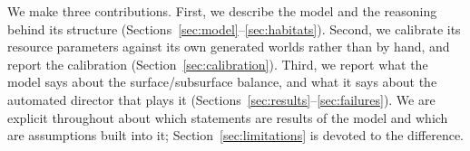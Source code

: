 We make three contributions. First, we describe the model and the reasoning
behind its structure (Sections~\ref{sec:model}--\ref{sec:habitats}). Second, we
calibrate its resource parameters against its own generated worlds rather than
by hand, and report the calibration
(Section~\ref{sec:calibration}). Third, we report what the model says about the
surface/subsurface balance, and what it says about the automated director that
plays it (Sections~\ref{sec:results}--\ref{sec:failures}). We are explicit
throughout about which statements are results of the model and which are
assumptions built into it; Section~\ref{sec:limitations} is devoted to the
difference.

